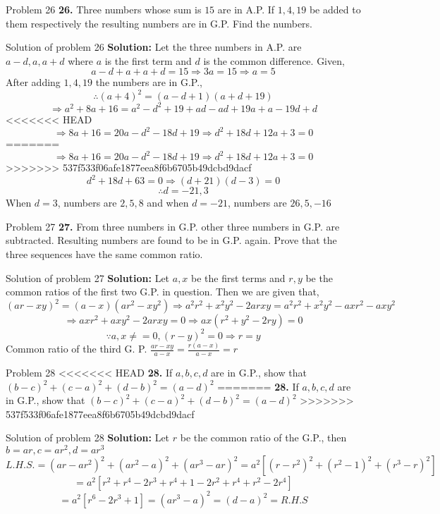 \documentclass[aspectratio=1610,8pt]{beamer}
\begin{document}
\begin{frame}{Problem 26}
  \textbf{26.} Three numbers whose sum is $15$ are in A.P. If $1, 4, 19$ be
  added to them respectively the resulting numbers are in G.P. Find the
  numbers.
\end{frame}
\begin{frame}{Solution of problem 26}
  \textbf{Solution:} Let the three numbers in A.P. are $a - d, a, a + d$ where
  $a$ is the first term and $d$ is the common difference. Given,
  $$a - d + a + a + d = 15 \Rightarrow 3a = 15 \Rightarrow a = 5$$
  After adding $1, 4, 19$ the numbers are in G.P.,
  $$\therefore (a + 4)^2 = (a - d + 1)(a + d + 19)$$
  $$\Rightarrow a^2 + 8a + 16 = a^2 - d^2 + 19 + ad - ad + 19a + a - 19d + d$$
<<<<<<< HEAD
  $$\Rightarrow 8a + 16 = 20a - d^2 - 18d + 19 \Rightarrow d^2 + 18d + 12a + 3  = 0$$
=======
  $$\Rightarrow 8a + 16 = 20a - d^2 - 18d + 19 \Rightarrow d^2 + 18d + 12a + 3
  = 0$$
>>>>>>> 537f533f06afe1877eea8f6b6705b49dcbd9dacf
  $$d^2 + 18d +63 = 0 \Rightarrow (d + 21)(d - 3) = 0$$
  $$\therefore d = -21, 3$$
  When $d = 3$, numbers are $2, 5, 8$ and when $d = -21$, numbers are $26, 5,
  -16$
\end{frame}
\begin{frame}{Problem 27}
  \textbf{27.} From three numbers in G.P. other three numbers in G.P. are
  subtracted. Resulting numbers are found to be in G.P. again. Prove that the
  three sequences have the same common ratio.
\end{frame}
\begin{frame}{Solution of problem 27}
  \textbf{Solution:} Let $a, x$ be the first terms and $r, y$ be the common
  ratios of the first two G.P. in question. Then we are given that,
  $$(ar - xy)^2 = (a - x)(ar^2 - xy^2) \Rightarrow a^2r^2 + x^2y^2 - 2arxy =
  a^2r^2 + x^2y^2 - axr^2 - axy^2$$
  $$\Rightarrow axr^2 + axy^2 - 2arxy = 0 \Rightarrow ax(r^2 + y^2 - 2ry) = 0$$
  $$\because a, x \neq = 0, (r - y)^2 = 0 \Rightarrow r = y$$
  Common ratio of the third G. P. $\frac{ar - xy}{a - x} = \frac{r(a - x)}{a -
    x} = r$
\end{frame}
\begin{frame}{Problem 28}
<<<<<<< HEAD
  \textbf{28.} If $a, b, c, d$ are in G.P., show that $(b - c)^2 + (c - a)^2 +  (d - b)^2 = (a - d)^2$
=======
  \textbf{28.} If $a, b, c, d$ are in G.P., show that $(b - c)^2 + (c - a)^2 +
  (d - b)^2 = (a - d)^2$
>>>>>>> 537f533f06afe1877eea8f6b6705b49dcbd9dacf
\end{frame}
\begin{frame}{Solution of problem 28}
  \textbf{Solution:} Let $r$ be the common ratio of the G.P., then $b = ar, c =
  ar^2, d= ar^3$
  $$L.H.S. = (ar - ar^2)^2 + (ar^2 - a)^2 + (ar^3 -ar)^2 = a^2[(r - r^2)^2 +
  (r^2 - 1)^2 + (r^3 -r)^2]$$
  $$= a^2[r^2 + r^4 - 2r^3 + r^4 + 1 - 2r^2 + r^4 + r^2 - 2r^4]$$
  $$= a^2[r^6 -2r^3 + 1] = (ar^3 - a)^2 = (d - a)^2 = R.H.S$$
\end{frame}
\end{document}
